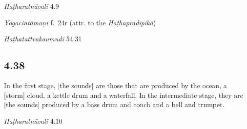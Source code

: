 \begin{ekdosis}

\begin{testimonia}[hp04_037]
\emph{Haṭharatnāvalī} 4.9
\begin{versinnote}
\end{versinnote}

\emph{Yogacintāmaṇi} f.~24r (attr. to the \emph{Haṭhapradīpikā})
\begin{versinnote}
\end{versinnote}

\emph{Haṭhatattvakaumudī} 54.31
\begin{versinnote}
\end{versinnote}
\end{testimonia}


\subsection*{4.38}
\begin{translation}[hp04_038]
In the first stage, [the sounds] are those that are produced by the ocean, a [storm] cloud, a kettle drum and a waterfall. In the intermediate stage, they are [the sounds] produced by a bass drum and conch and a bell and trumpet.
\end{translation}


\begin{testimonia}[hp04_038]
\emph{Haṭharatnāvalī} 4.10
\begin{versinnote}
\end{versinnote}


\end{testimonia}
\end{ekdosis}
